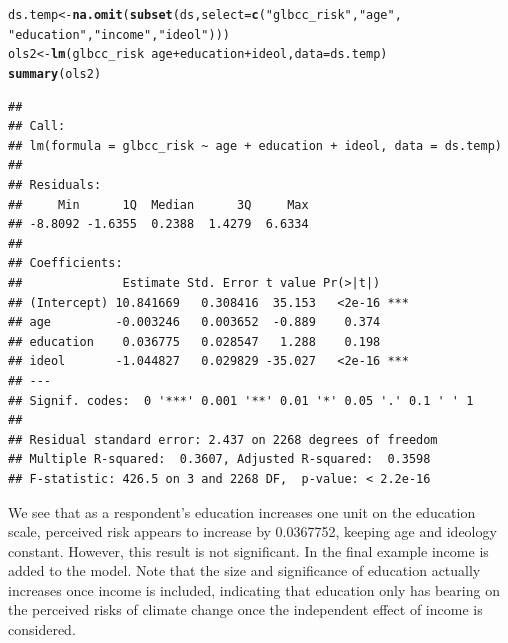 \documentclass[11pt,openany]{book}\usepackage[]{graphicx}\usepackage[]{color}
\makeatletter
\newcommand{\hlstr}[1]{\textcolor[rgb]{0.192,0.494,0.8}{#1}}%
\newcommand{\hlopt}[1]{\textcolor[rgb]{0,0,0}{#1}}%
\newcommand{\hlstd}[1]{\textcolor[rgb]{0.345,0.345,0.345}{#1}}%
\newcommand{\hlkwb}[1]{\textcolor[rgb]{0.69,0.353,0.396}{#1}}%
\newcommand{\hlkwc}[1]{\textcolor[rgb]{0.333,0.667,0.333}{#1}}%
\newcommand{\hlkwd}[1]{\textcolor[rgb]{0.737,0.353,0.396}{\textbf{#1}}}%
\newenvironment{kframe}{%
 \def\at@end@of@kframe{}%
 \ifinner\ifhmode%
  \def\at@end@of@kframe{\end{minipage}}%
  \begin{minipage}{\columnwidth}%
 \fi\fi%
 \def\FrameCommand##1{\hskip\@totalleftmargin \hskip-\fboxsep
 \colorbox{shadecolor}{##1}\hskip-\fboxsep
     \hskip-\linewidth \hskip-\@totalleftmargin \hskip\columnwidth}%
 \MakeFramed {\advance\hsize-\width
   \@totalleftmargin\z@ \linewidth\hsize
   \@setminipage}}%
 {\par\unskip\endMakeFramed%
 \at@end@of@kframe}
\newenvironment{knitrout}{}{} %
\renewenvironment{knitrout}{\begin{singlespace}}{\end{singlespace}}
\makeatother
\begin{document}
\begin{knitrout}
\color{fgcolor}\begin{kframe}
\begin{alltt}
\hlstd{ds.temp} \hlkwb{<-} \hlkwd{na.omit}\hlstd{(}\hlkwd{subset}\hlstd{(ds,} \hlkwc{select} \hlstd{=} \hlkwd{c}\hlstd{(}\hlstr{"glbcc_risk"}\hlstd{,} \hlstr{"age"}\hlstd{,}
    \hlstr{"education"}\hlstd{,} \hlstr{"income"}\hlstd{,} \hlstr{"ideol"}\hlstd{)))}
\hlstd{ols2} \hlkwb{<-} \hlkwd{lm}\hlstd{(glbcc_risk} \hlopt{~} \hlstd{age} \hlopt{+} \hlstd{education} \hlopt{+} \hlstd{ideol,} \hlkwc{data} \hlstd{= ds.temp)}
\hlkwd{summary}\hlstd{(ols2)}
\end{alltt}
\begin{verbatim}
## 
## Call:
## lm(formula = glbcc_risk ~ age + education + ideol, data = ds.temp)
## 
## Residuals:
##     Min      1Q  Median      3Q     Max 
## -8.8092 -1.6355  0.2388  1.4279  6.6334 
## 
## Coefficients:
##              Estimate Std. Error t value Pr(>|t|)    
## (Intercept) 10.841669   0.308416  35.153   <2e-16 ***
## age         -0.003246   0.003652  -0.889    0.374    
## education    0.036775   0.028547   1.288    0.198    
## ideol       -1.044827   0.029829 -35.027   <2e-16 ***
## ---
## Signif. codes:  0 '***' 0.001 '**' 0.01 '*' 0.05 '.' 0.1 ' ' 1
## 
## Residual standard error: 2.437 on 2268 degrees of freedom
## Multiple R-squared:  0.3607,	Adjusted R-squared:  0.3598 
## F-statistic: 426.5 on 3 and 2268 DF,  p-value: < 2.2e-16
\end{verbatim}
\end{kframe}
\end{knitrout}

We see that as a respondent's education increases one unit on the education scale, perceived risk appears to increase by 0.0367752, keeping age and ideology constant. However, this result is not significant. In the final example income is added to the model. Note that the size and  significance of education actually increases once income is included, indicating that education only has  bearing on the perceived risks of climate change once the independent effect of income is considered.
\end{document}
